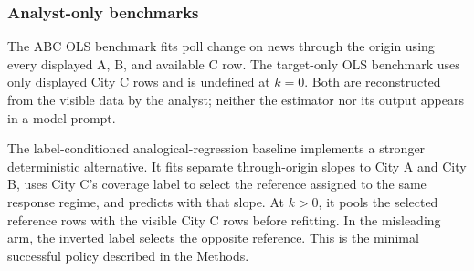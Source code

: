 \subsubsection{Analyst-only benchmarks}
The ABC OLS benchmark fits poll change on news through the origin using every
displayed A, B, and available C row. The target-only OLS benchmark uses only
displayed City C rows and is undefined at \(k=0\). Both are reconstructed from
the visible data by the analyst; neither the estimator nor its output appears in
a model prompt.


The label-conditioned analogical-regression baseline implements a stronger
deterministic alternative. It fits separate through-origin slopes to City A and
City B, uses City C's coverage label to select the reference assigned to the same
response regime, and predicts with that slope. At $k>0$, it pools the selected
reference rows with the visible City C rows before refitting. In the misleading
arm, the inverted label selects the opposite reference. This is the minimal
successful policy described in the Methods.

\begin{center}
\begin{minipage}{\linewidth}
\centering
{}
\label{tab:coin-city-analogical}
\scriptsize
\setlength{\tabcolsep}{3pt}
\end{minipage}
\end{center}


